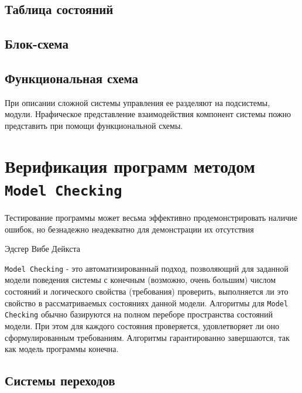 \documentclass[12pt, twoside]{report}
\begin{document}
\section*{Таблица состояний}

\section*{Блок-схема}

\section*{Функциональная схема}

При описании сложной системы управления ее разделяют на подсистемы, модули. Нрафическое представление взаимодействия компонент системы пожно представить при помощи функциональной схемы.

\chapter*{Верификация программ методом \texttt{Model Checking}}

\epigraph{Тестирование программы может весьма эффективно продемонстрировать наличие ошибок, но безнадежно неадекватно для демонстрации их отсутствия}{Эдсгер Вибе Дейкста}


\texttt{Model Checking\cite{Shalito:ModelChecking}} - это автоматизированный подход, позволяющий для заданной модели поведения 
системы с конечным (возможно, очень большим) числом состояний и логического свойства 
(требования) проверить, выполняется ли это свойство в рассматриваемых состояниях данной модели.
Алгоритмы для \texttt{Model Checking} обычно базируются на полном переборе пространства состояний модели. 
При этом для каждого состояния проверяется, удовлетворяет ли оно сформулированным требованиям. 
Алгоритмы гарантированно завершаются, так как модель программы конечна.

\newpage
\section*{Системы переходов\cite{Mironov:ModelChecking}}
\label{system_SEQUENCE}
\end{document}
